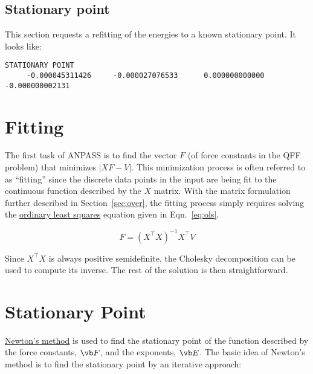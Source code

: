 \documentclass{article}
\begin{document}
\subsection{Stationary point}

This section requests a refitting of the energies to a known stationary point.
It looks like:

\begin{lstlisting}
STATIONARY POINT
     -0.000045311426     -0.000027076533      0.000000000000     -0.000000002131
\end{lstlisting}


\section{Fitting}
\label{sec:fit}

The first task of ANPASS is to find the vector $F$ (of force constants in the
QFF problem) that minimizes $|XF - V|$. This minimization process is often
referred to as ``fitting'' since the discrete data points in the input are being
fit to the continuous function described by the $X$ matrix. With the matrix
formulation further described in Section~\ref{sec:over}, the fitting process
simply requires solving the
\href{https://en.wikipedia.org/wiki/Ordinary_least_squares}{ordinary least
  squares} equation given in Eqn.~\ref{eq:ols}.

\begin{equation}
  \label{eq:ols}
  F = (X^\intercal X)^{-1}X^\intercal V
\end{equation}

Since $X^\intercal X$ is always positive semidefinite, the Cholesky
decomposition can be used to compute its inverse. The rest of the solution is
then straightforward.

\section{Stationary Point}

\href{https://en.wikipedia.org/wiki/Newton\%27s_method_in_optimization}{Newton's
  method} is used to find the stationary point of the function described by the
force constants, $\vb F$, and the exponents, $\vb E$. The basic idea of Newton's
method is to find the stationary point by an iterative approach:
\end{document}
